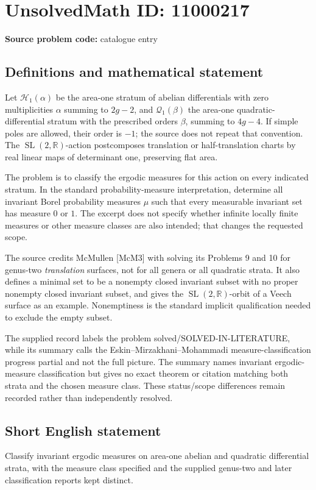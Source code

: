 \documentclass[11pt]{article}
\newcommand{\R}{\mathbb{R}}
\begin{document}
\section*{UnsolvedMath ID: 11000217}
\textbf{Source problem code:} catalogue entry
\subsection{Definitions and mathematical statement}
Let \(\mathcal H_1(\alpha)\) be the area-one stratum of abelian differentials with zero multiplicities \(\alpha\) summing to \(2g-2\), and \(\mathcal Q_1(\beta)\) the area-one quadratic-differential stratum with the prescribed orders \(\beta\), summing to \(4g-4\). If simple poles are allowed, their order is \(-1\); the source does not repeat that convention. The \(\operatorname{SL}(2,\R)\)-action postcomposes translation or half-translation charts by real linear maps of determinant one, preserving flat area.

The problem is to classify the ergodic measures for this action on every indicated stratum. In the standard probability-measure interpretation, determine all invariant Borel probability measures \(\mu\) such that every measurable invariant set has measure \(0\) or \(1\). The excerpt does not specify whether infinite locally finite measures or other measure classes are also intended; that changes the requested scope.

The source credits McMullen [McM3] with solving its Problems 9 and 10 for genus-two \emph{translation} surfaces, not for all genera or all quadratic strata. It also defines a minimal set to be a nonempty closed invariant subset with no proper nonempty closed invariant subset, and gives the \(\operatorname{SL}(2,\R)\)-orbit of a Veech surface as an example. Nonemptiness is the standard implicit qualification needed to exclude the empty subset.

The supplied record labels the problem solved/SOLVED-IN-LITERATURE, while its summary calls the Eskin--Mirzakhani--Mohammadi measure-classification progress partial and not the full picture. The summary names invariant ergodic-measure classification but gives no exact theorem or citation matching both strata and the chosen measure class. These status/scope differences remain recorded rather than independently resolved.
\subsection{Short English statement}
Classify invariant ergodic measures on area-one abelian and quadratic differential strata, with the measure class specified and the supplied genus-two and later classification reports kept distinct.
\end{document}
